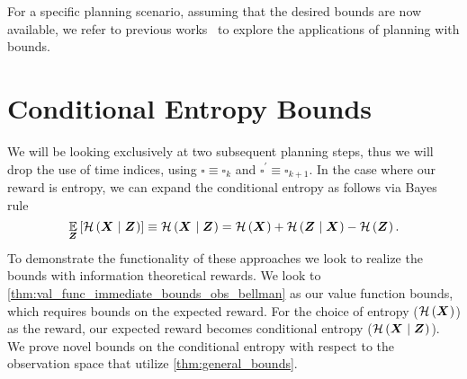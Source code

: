 For a specific planning scenario, assuming that the desired bounds are now available, we refer to previous works~\cite{Sztyglic22iros,Barenboim22ijcai} to explore the applications of planning with bounds.


\section{Conditional Entropy Bounds}\label{sec:cond_ent_bounds}
We will be looking exclusively at two subsequent planning steps, thus we will drop the use of time indices, using $\square\equiv\square_k$ and $\square^\prime\equiv\square_{k+1}$.
In the case where our reward is entropy, we can expand the conditional entropy as follows via Bayes rule
\begin{equation}
		\operatorname*{\mathbb{E}}\limits_{\boldsymbol Z_{}}\left[{\mathcal{H}\left({\boldsymbol X_{}}\mid{\ensuremath{\boldsymbol Z_{}}}\right)}\right]\equiv\mathcal{H}\left({\boldsymbol X_{}}\mid{\ensuremath{\boldsymbol Z_{}}}\right)=\mathcal{H}\left({\boldsymbol X_{}}\right)+\mathcal{H}\left({\boldsymbol Z_{}}\mid{\ensuremath{\boldsymbol X_{}}}\right)-\mathcal{H}\left({\boldsymbol Z_{}}\right).\label{eq:bayes_entropy}
\end{equation}
To demonstrate the functionality of these approaches we look to realize the bounds with information theoretical rewards. We look to \autoref{thm:val_func_immediate_bounds_obs_bellman} as our value function bounds, which requires bounds on the expected reward. For the choice of entropy ($\mathcal{H}\left({\boldsymbol X_{}}\right)$) as the reward, our expected reward becomes conditional entropy ($\mathcal{H}\left({\boldsymbol X_{}}\mid{\ensuremath{\boldsymbol Z_{}}}\right)$). We prove novel bounds on the conditional entropy with respect to the observation space that utilize \cref{thm:general_bounds}.

